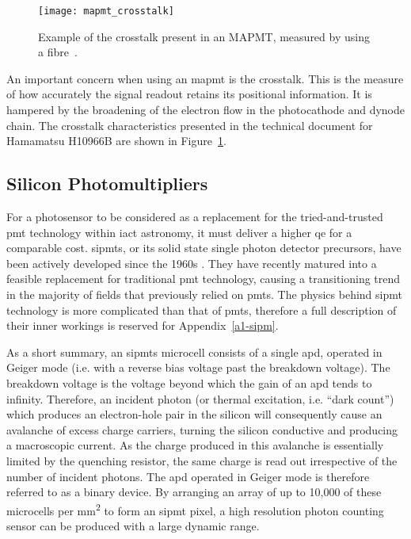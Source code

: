 \begin{figure}
	\centering
    \texttt{[image: mapmt\_crosstalk]} 
	\caption[Multi-Anode Photomultiplier Tube crosstalk.]{Example of the crosstalk present in an MAPMT, measured by using a fibre~\cite{Hamamatsu2011}.}
	\label{fig:mapmt_crosstalk}
\end{figure}

An important concern when using an \gls{mapmt} is the crosstalk. This is the measure of how accurately the signal readout retains its positional information. It is hampered by the broadening of the electron flow in the photocathode and dynode chain. The crosstalk characteristics presented in the technical document for Hamamatsu H10966B are shown in Figure~\ref{fig:mapmt_crosstalk}.

\subsection{Silicon Photomultipliers}

For a photosensor to be considered as a replacement for the tried-and-trusted \gls{pmt} technology within \gls{iact} astronomy, it must deliver a higher \gls{qe} for a comparable cost. \glspl{sipmt}, or its solid state single photon detector precursors, have been actively developed since the 1960s \cite{Renker2006}. They have recently matured into a feasible replacement for traditional \gls{pmt} technology, causing a transitioning trend in the majority of fields that previously relied on \glspl{pmt}. The physics behind \gls{sipmt} technology is more complicated than that of \glspl{pmt}, therefore a full description of their inner workings is reserved for Appendix~\ref{a1-sipm}.

As a short summary, an \glspl{sipmt} microcell consists of a single \gls{apd}, operated in Geiger mode (i.e. with a reverse bias voltage past the breakdown voltage). The breakdown voltage is the voltage beyond which the gain of an \gls{apd} tends to infinity. Therefore, an incident photon (or thermal excitation, i.e. ``dark count'') which produces an electron-hole pair in the silicon will consequently cause an avalanche of excess charge carriers, turning the silicon conductive and producing a macroscopic current. As the charge produced in this avalanche is essentially limited by the quenching resistor, the same charge is read out irrespective of the number of incident photons. The \gls{apd} operated in Geiger mode is therefore referred to as a binary device. By arranging an array of up to 10,000 of these microcells per \si{mm\squared} to form an \gls{sipmt} pixel, a high resolution photon counting sensor can be produced with a large dynamic range.


